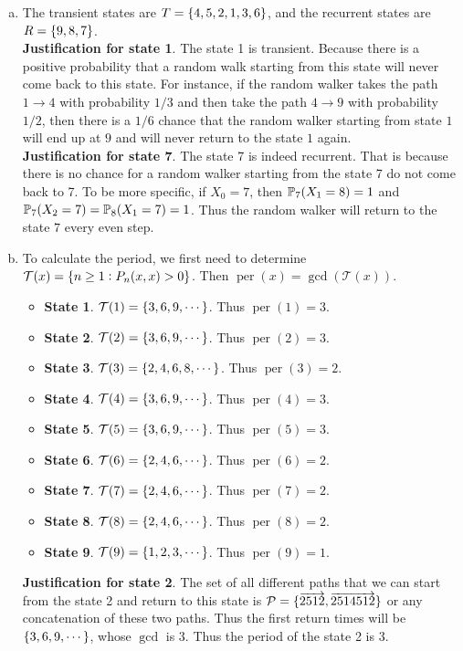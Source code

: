 \begin{solution}
	\begin{enumerate}[(a)]
		\item The transient states are $T = \{4,5,2,1,3,6\}$, and the recurrent states are $R = \{9,8,7\}$.\\
		\textbf{Justification for state 1}. The state 1 is transient. Because there is a positive probability that a random walk starting from this state will never come back to this state. For instance, if the random walker takes the path $1\rightarrow4$ with probability $1/3$ and then take the path $4\rightarrow9$ with probability $1/2$, then there is a $1/6$ chance that the random walker starting from state $1$ will end up at $9$ and will never return to the state $1$ again. \\
		\textbf{Justification for state 7}. The state 7 is indeed recurrent. That is because there is no chance for a random walker starting from the state 7 do not come back to 7. To be more specific, if $X_0 = 7$, then $\mathbb{P}_7(X_1=8) = 1$ and $\mathbb{P}_7(X_2 = 7) = \mathbb{P}_8(X_1=7) = 1$. Thus the random walker will return to the state $7$ every even step.
		
		\item To calculate the period, we first need to determine $\mathcal{T}(x) = \{n\geq 1: P_n(x,x)>0\}$. Then $\operatorname{per}(x) = \gcd(\mathcal{T}(x))$.
		\begin{itemize}
			\item \textbf{State 1}. $\mathcal{T}(1) = \{3,6,9,\cdots\}$. Thus $\operatorname{per}(1) = 3$.
			\item \textbf{State 2}. $\mathcal{T}(2) = \{3,6,9,\cdots\}$. Thus $\operatorname{per}(2) = 3$.
			\item \textbf{State 3}. $\mathcal{T}(3) = \{2,4,6,8,\cdots\}$. Thus $\operatorname{per}(3) = 2$.
			\item \textbf{State 4}. $\mathcal{T}(4) = \{3,6,9,\cdots\}$. Thus $\operatorname{per}(4) = 3$.
			\item \textbf{State 5}. $\mathcal{T}(5) = \{3,6,9,\cdots\}$. Thus $\operatorname{per}(5) = 3$.
			\item \textbf{State 6}. $\mathcal{T}(6) = \{2,4,6,\cdots\}$. Thus $\operatorname{per}(6) = 2$.
			\item \textbf{State 7}. $\mathcal{T}(7) = \{2,4,6,\cdots\}$. Thus $\operatorname{per}(7) = 2$.
			\item \textbf{State 8}. $\mathcal{T}(8) = \{2,4,6,\cdots\}$. Thus $\operatorname{per}(8) = 2$.
			\item \textbf{State 9}. $\mathcal{T}(9) = \{1,2,3,\cdots\}$. Thus $\operatorname{per}(9) = 1$.
		\end{itemize}
		\textbf{Justification for state 2}. The set of all different paths that we can start from the state 2 and return to this state is $\mathcal{P} = \{\overrightarrow{2512},\overrightarrow{2514512}\}$ or any concatenation of these two paths. Thus the first return times will be $\{3,6,9,\cdots\}$, whose $\gcd$ is 3. Thus the period of the state 2 is 3.		
		

\end{enumerate}
\end{solution}
